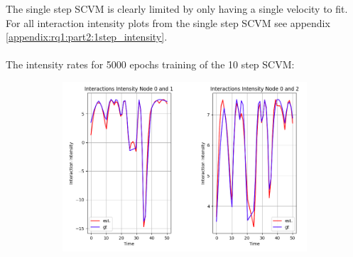 \noindent
The single step SCVM is clearly limited by only having a single velocity to fit.
For all interaction intensity plots from the single step SCVM  see appendix \ref{appendix:rq1:part2:1step_intensity}.
\\\\
The intensity rates for 5000 epochs training of the 10 step SCVM:
\begin{figure}[H]
    \centering
    \begin{subfigure}[b]{\textwidth}
        \centering
        \includegraphics[width=\textwidth]{0_images/rq1_10step_SCVM_intensity1.png}
    \end{subfigure}
    \vfill
    \begin{subfigure}[b]{0.45\textwidth}
        \centering

\end{subfigure}
\end{figure}
